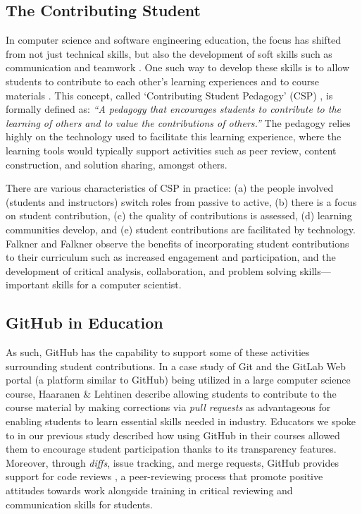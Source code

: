 \subsection{The Contributing Student}
In computer science and software engineering education, the focus has shifted from not just technical skills, but also the development of soft skills such as communication and teamwork \cite{jazayeri2004education}. One such way to develop these skills is to allow students to contribute to each other's learning experiences and to course materials \cite{hamer2006some}. This concept, called `Contributing Student Pedagogy' (CSP) \cite{hamer2008contributing}, is formally defined as: \textit{``A pedagogy that encourages students to contribute to the learning of others and to value the contributions of others.''} The pedagogy relies highly on the technology used to facilitate this learning experience, where the learning tools would typically support activities such as peer review, content construction, and solution sharing, amongst others.

There are various characteristics of CSP in practice: (a) the people involved (students and instructors) switch roles from passive to active, (b) there is a focus on student contribution, (c) the quality of contributions is assessed, (d) learning communities develop, and (e) student contributions are facilitated by technology. Falkner and Falkner \cite{falkner2012supporting} observe the benefits of incorporating student contributions to their curriculum such as increased engagement and participation, and the development of critical analysis, collaboration, and problem solving skills---important skills for a computer scientist.

\subsection{GitHub in Education}
As such, GitHub has the capability to support some of these activities surrounding student contributions. In a case study of Git and the GitLab Web portal (a platform similar to GitHub) being utilized in a large computer science course, Haaranen \& Lehtinen \cite{haaranen2015teaching} describe allowing students to contribute to the course material by making corrections via \emph{pull requests} as advantageous for enabling students to learn essential skills needed in industry. Educators we spoke to in our previous study \cite{zagalsky2015emergence} described how using GitHub in their courses allowed them to encourage student participation thanks to its transparency features. Moreover, through \emph{diffs}, issue tracking, and merge requests, GitHub provides support for code reviews \cite{kalliamvakou2014promises}, a peer-reviewing process that promote positive attitudes towards work alongside training in critical reviewing and communication skills \cite{hundhausen2013talking} for students.

